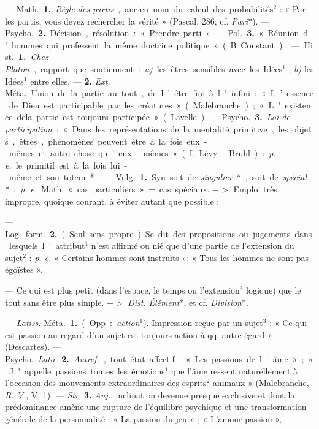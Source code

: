 \begin{itemize}[leftmargin=1cm, label=, itemsep=1pt]
 — \si{Math.} {\bf 1.} {\it Règle des partis}, ancien nom du calcul
des probabilités$^2$ : « Par les partis, vous devez rechercher la vérité
» (Pascal, 286; cf. {\it Pari}*). — \si{Psycho.} {\bf 2.} Décision,
résolution : « Prendre parti » — \si{Pol.} {\bf 3.} « Réunion d'hommes qui
professent la même doctrine politique » (B. Constant).

 — \si{Hist.} {\bf 1.} {\it Chez Platon}, rapport que
soutiennent : {\it a)} les êtres sensibles avec les Idées$^1$ ; {\it b)} les
Idées$^1$ entre elles. — {\bf 2.} {\it Ext.} \si{Méta.} Union de la partie au
tout, de l’être fini à l'infini : « L’essence de Dieu est participable par
les créatures » (Malebranche) ; « L'existence dela partie est toujours
participée » (Lavelle).

— \si{Psycho.} {\bf 3.} {\it Loi de participation} : « Dans les
représentations de la mentalité primitive, les objets, êtres, phénomènes
peuvent être à la fois eux-mêmes et autre chose qu’eux-mêmes » (L.
Lévy-Bruhl) : {\it p. e.} le primitif est à la fois lui-même et son totem*.

 — \si{Vulg.} {\bf 1.} Syn. soit de {\it singulier}*, soit de
{\it spécial}* : {\it p. e.} \si{Math.} « cas particuliers » = cas spéciaux.
$->$ Emploi très impropre, quoique courant, à éviter autant que possible :

— \si{Log.} \si{form.} {\bf 2.} (Seul sens propre). Se dit des propositions
ou jugements dans lesquels l’attribut$^1$ n'est affirmé ou nié que d’une
partie de l’extension du sujet$^2$ : {\it p. e.} « Certains hommes sont
instruits »; « Tous les hommes ne sont pas égoïstes ».

 — Ce qui est plus petit (dans l'espace, le temps ou
l'extension$^3$ logique) que le tout sans être plus simple. $->$ {\it Dist.}
{\it Élément}*, et cf. {\it Division}*.

 — {\it Latiss.} \si{Méta.} {\bf 1.} (Opp. : {\it action}$^1$).
Impression reçue par un sujet$^3$ : « Ce qui est passion au regard d’un sujet
est toujours action à qq. autre égard » (Descartes). — \si{Psycho.}
{\it Lato.} {\bf 2.} {\it Autref.}, tout état affectif : « Les passions de
l'âme » ; « J'appelle passions toutes les émotions$^1$ que l’âme ressent
naturellement à l’occasion des mouvements extraordinaires des esprits$^2$
animaux » (Malebranche, {\it R. V.}, V, 1). — {\it Str.} {\bf 3.} {\it Auj.},
inclination devenue presque exclusive et dont la prédominance amène une
rupture de l'équilibre psychique et une transformation générale de la
 personnalité : « La passion du jeu » ; « L'amour-passion »,


\end{itemize}
